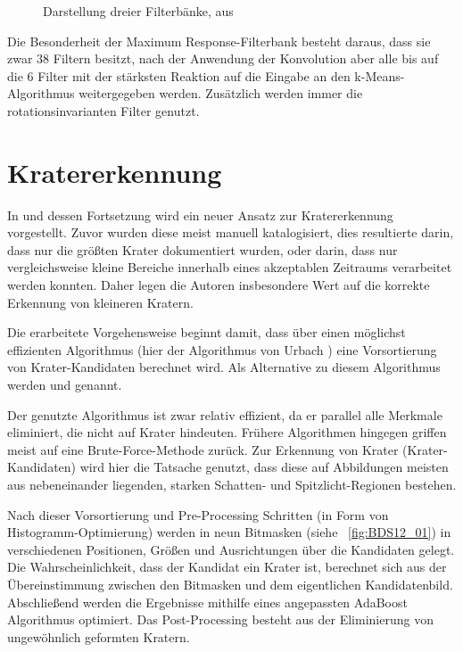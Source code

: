 \begin{figure}[h!]
\begin{subfigure}[t]{0.21\textwidth}
	\end{subfigure}
	\caption{Darstellung dreier Filterbänke, aus \cite{visgeo}}
	\label{fig:filterbank}
\end{figure}

Die Besonderheit der Maximum Response-Filterbank besteht daraus, dass sie zwar 38 Filtern besitzt, nach der Anwendung der Konvolution aber alle bis auf die 6 Filter mit der stärksten Reaktion auf die Eingabe an den k-Means-Algorithmus weitergegeben werden. Zusätzlich werden immer die rotationsinvarianten Filter genutzt.

\section{Kratererkennung}
\label{sec:crater_detection}

In \cite{bandeira_10} und dessen Fortsetzung \cite{bandeira_12} wird ein neuer Ansatz zur Kratererkennung vorgestellt. Zuvor wurden diese meist manuell katalogisiert, dies resultierte darin, dass nur die größten Krater dokumentiert wurden, oder darin, dass nur vergleichsweise kleine Bereiche innerhalb eines akzeptablen Zeitraums verarbeitet werden konnten. Daher legen die Autoren insbesondere Wert auf die korrekte Erkennung von kleineren Kratern.

Die erarbeitete Vorgehensweise beginnt damit, dass über einen möglichst effizienten Algorithmus (hier der Algorithmus von Urbach \etal \cite{urbach_stepinski_2009}) eine Vorsortierung von Krater-Kandidaten berechnet wird. Als Alternative zu diesem Algorithmus werden \cite{bandeira_07} und \cite{salamuniccar_10} genannt.

Der genutzte Algorithmus ist zwar relativ effizient, da er parallel alle Merkmale eliminiert, die nicht auf Krater hindeuten. Frühere Algorithmen hingegen griffen meist auf eine Brute-Force-Methode zurück. Zur Erkennung von Krater (\bzw Krater-Kandidaten) wird hier die Tatsache genutzt, dass diese auf Abbildungen meisten aus nebeneinander liegenden, starken Schatten- und Spitzlicht-Regionen bestehen.

Nach dieser Vorsortierung und Pre-Processing Schritten (in Form von Histogramm-Optimierung) werden in \cite{bandeira_10, bandeira_12} neun Bitmasken (siehe \figurename~\ref{fig:BDS12_01}) in verschiedenen Positionen, Größen und Ausrichtungen über die Kandidaten gelegt. Die Wahrscheinlichkeit, dass der Kandidat ein Krater ist, berechnet sich aus der Übereinstimmung zwischen den Bitmasken und dem eigentlichen Kandidatenbild. Abschließend werden die Ergebnisse mithilfe eines angepassten AdaBoost Algorithmus optimiert. Das Post-Processing besteht aus der Eliminierung von ungewöhnlich geformten Kratern.

